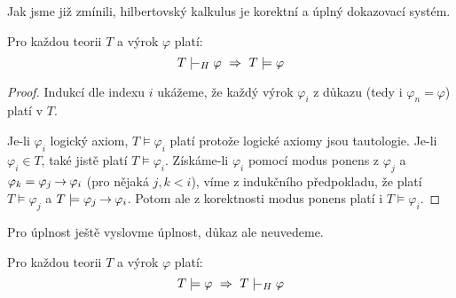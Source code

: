 Jak jsme již zmínili, hilbertovský kalkulus je korektní a úplný dokazovací systém.

\begin{theorem}
Pro každou teorii $T$ a výrok $\varphi$ platí: 
$$
T\proves_H \varphi\ \Rightarrow\ T\models\varphi
$$ 
\end{theorem}
\begin{proof}
Indukcí dle indexu $i$ ukážeme, že každý výrok $\varphi_i$ z důkazu (tedy i $\varphi_n=\varphi$) platí v $T$.

Je-li $\varphi_i$ logický axiom, $T \models \varphi_i$ platí protože logické axiomy jsou tautologie. Je-li $\varphi_i\in T$, také jistě platí $T \models \varphi_i$. Získáme-li $\varphi_i$ pomocí modus ponens z $\varphi_j$ a $\varphi_k=\varphi_j\mathbin{\rightarrow}\varphi_i$ (pro nějaká $j,k<i$), víme z indukčního předpokladu, že platí $T \models \varphi_j$ a $T \models \varphi_j\mathbin{\rightarrow}\varphi_i$. Potom ale z korektnosti modus ponens platí i $T \models \varphi_i$.
\end{proof}

Pro úplnost ještě vyslovme úplnost, důkaz ale neuvedeme.

\begin{theorem}
Pro každou teorii $T$ a výrok $\varphi$ platí: 
$$
T\models\varphi\ \Rightarrow\ T\proves_H\varphi
$$
\end{theorem}





